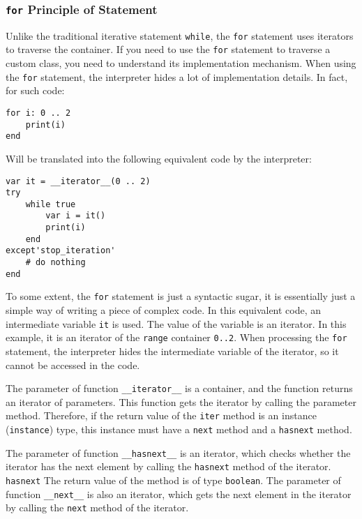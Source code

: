\subsubsection{\texttt{for} Principle of Statement}

Unlike the traditional iterative statement \texttt{while}, the \texttt{for} statement uses iterators to traverse the container. If you need to use the \texttt{for} statement to traverse a custom class, you need to understand its implementation mechanism. When using the \texttt{for} statement, the interpreter hides a lot of implementation details. In fact, for such code:
\begin{lstlisting}[language=berry]
for i: 0 .. 2
    print(i)
end
\end{lstlisting}
Will be translated into the following equivalent code by the interpreter:
\begin{lstlisting}[language=berry]
var it = __iterator__(0 .. 2)
try
    while true
        var i = it()
        print(i)
    end
except'stop_iteration'
    # do nothing
end
\end{lstlisting}To some extent, the \texttt{for} statement is just a syntactic sugar, it is essentially just a simple way of writing a piece of complex code. In this equivalent code, an intermediate variable \texttt{it} is used. The value of the variable is an iterator. In this example, it is an iterator of the \texttt{range} container \texttt{0..2}. When processing the \texttt{for} statement, the interpreter hides the intermediate variable of the iterator, so it cannot be accessed in the code.

The parameter of function \texttt{\_\_iterator\_\_} is a container, and the function returns an iterator of parameters. This function gets the iterator by calling the parameter  method. Therefore, if the return value of the \texttt{iter} method is an instance (\texttt{instance}) type, this instance must have a \texttt{next} method and a \texttt{hasnext} method.

The parameter of function \texttt{\_\_hasnext\_\_} is an iterator, which checks whether the iterator has the next element by calling the \texttt{hasnext} method of the iterator. \texttt{hasnext} The return value of the method is of type \texttt{boolean}. The parameter of function \texttt{\_\_next\_\_} is also an iterator, which gets the next element in the iterator by calling the \texttt{next} method of the iterator.

